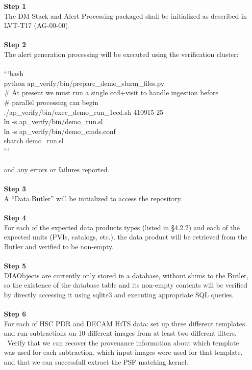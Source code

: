 \textbf{Step 1}\\
The DM Stack and Alert Processing packaged shall be initialized as
described in LVT-T17 (AG-00-00).\\
~\\
\textbf{Step 2}\\
The alert generation processing will be executed using the verification
cluster:\\
~\\
```bash\\
python ap\_verify/bin/prepare\_demo\_slurm\_files.py\\
\# At present we must run a single ccd+visit to handle ingestion
before\\
\# parallel processing can begin\\
./ap\_verify/bin/exec\_demo\_run\_1ccd.sh 410915 25\\
ln -s ap\_verify/bin/demo\_run.sl\\
ln -s ap\_verify/bin/demo\_cmds.conf\\
sbatch demo\_run.sl\\
```\\
~\\
and any errors or failures reported.\\
~\\
\textbf{Step 3}\\
A ``Data Butler'' will be initialized to access the repository.\\
~\\
\textbf{Step 4}\\
For each of the expected data products types (listed in §4.2.2) and each
of the expected units (PVIs, catalogs, etc.), the data product will be
retrieved from the Butler and verified to be non-empty.\\
~\\
\textbf{Step 5}\\
DIAObjects are currently only stored in a database, without shims to the
Butler, so the existence of the database table and its non-empty
contents will be verified by directly accessing it using sqlite3 and
executing appropriate SQL queries.\\
~\\
\textbf{Step 6}\\
For each of HSC PDR and DECAM HiTS data: set up three different
templates and run subtractions on 10 different images from at least two
different filters. ~Verify that we can recover the provenance
information about which template was used for each subtraction, which
input images were used for that template, and that we can successfull
extract the PSF matching kernel.\\
~\\

